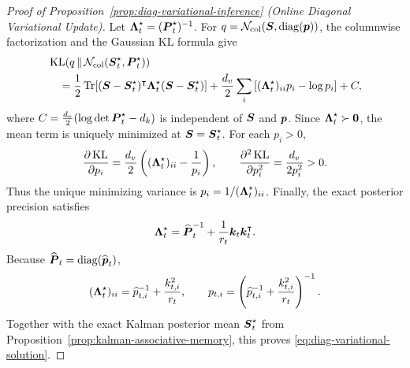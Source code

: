 \documentclass[11pt,letterpaper,logo]{yalearxiv}
\begin{document}
\begin{proof}[Proof of Proposition~\ref{prop:diag-variational-inference}
  (Online Diagonal Variational Update)]
Let $\boldsymbol{\Lambda}_t^\star=(\boldsymbol{P}_t^\star)^{-1}$. For
$q=\mathcal N_{\mathrm{col}}(\boldsymbol{S},\operatorname{diag}(\boldsymbol{p}))$, the columnwise factorization and the Gaussian KL formula give
\begin{equation}
\begin{aligned}
  &\operatorname{KL}\!\left(
    q\,\|\,\mathcal N_{\mathrm{col}}(\boldsymbol{S}_t^\star,\boldsymbol{P}_t^\star)
  \right) \\
  &\quad
    =\frac12\operatorname{Tr}\!\left[
      (\boldsymbol{S}-\boldsymbol{S}_t^\star)^{\intercal}
      \boldsymbol{\Lambda}_t^\star
      (\boldsymbol{S}-\boldsymbol{S}_t^\star)
    \right]
    +\frac{d_v}{2}\sum_i\left[
      (\boldsymbol{\Lambda}_t^\star)_{ii}p_i
      -\log p_i
    \right]+C,
  \label{eq:proof-diag-vi-objective}
\end{aligned}
\end{equation}
where $C=\frac{d_v}{2}(\log\det\boldsymbol{P}_t^\star-d_k)$ is independent of $\boldsymbol{S}$ and $\boldsymbol{p}$.
Since $\boldsymbol{\Lambda}_t^\star\succ\boldsymbol{0}$, the mean term is uniquely minimized at
$\boldsymbol{S}=\boldsymbol{S}_t^\star$. For each $p_i>0$,
\begin{equation}
  \frac{\partial\operatorname{KL}}{\partial p_i}
  =\frac{d_v}{2}\left(
    (\boldsymbol{\Lambda}_t^\star)_{ii}-\frac{1}{p_i}
  \right),
  \qquad
  \frac{\partial^2\operatorname{KL}}{\partial p_i^2}
  =\frac{d_v}{2p_i^2}>0.
  \label{eq:proof-diag-vi-derivatives}
\end{equation}
Thus the unique minimizing variance is
$p_i=1/(\boldsymbol{\Lambda}_t^\star)_{ii}$. Finally, the exact posterior precision satisfies
\begin{equation}
  \boldsymbol{\Lambda}_t^\star
  =\widehat{\boldsymbol{P}}_t^{-1}
   +\frac{1}{r_t}\boldsymbol{k}_t\boldsymbol{k}_t^{\intercal}.
  \label{eq:proof-diag-vi-exact-precision}
\end{equation}
Because $\widehat{\boldsymbol{P}}_t=\operatorname{diag}(\widehat{\boldsymbol{p}}_t)$,
\begin{equation}
  (\boldsymbol{\Lambda}_t^\star)_{ii}
  =\widehat p_{t,i}^{-1}+\frac{k_{t,i}^2}{r_t},
  \qquad
  p_{t,i}
  =\left(\widehat p_{t,i}^{-1}+\frac{k_{t,i}^2}{r_t}\right)^{-1}.
  \label{eq:proof-diag-vi-variance}
\end{equation}
Together with the exact Kalman posterior mean $\boldsymbol{S}_t^\star$ from
Proposition~\ref{prop:kalman-associative-memory}, this proves
\eqref{eq:diag-variational-solution}.
\end{proof}

\end{document}
